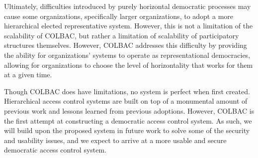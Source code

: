 Ultimately, difficulties introduced by purely horizontal democratic processes
may cause some organizations, specifically larger organizations, to adopt a more
hierarchical elected representative system. However, this is not a limitation of
the scalability of COLBAC, but rather a limitation of scalability of
participatory structures themselves. However, COLBAC addresses this difficulty
by providing the ability for organizations' systems to operate as
representational democracies, allowing for organizations to choose the level of
horizontality that works for them at a given time.

Though COLBAC does have limitations, no system is perfect when first
created. Hierarchical access control systems are built on top of a monumental
amount of previous work and lessons learned from previous adoptions. However,
COLBAC is the first attempt at constructing a democratic access control system.
As such, we will build upon the proposed system in future work to solve some of
the security and usability issues, and we expect to arrive at a more
usable and secure democratic access control system.
